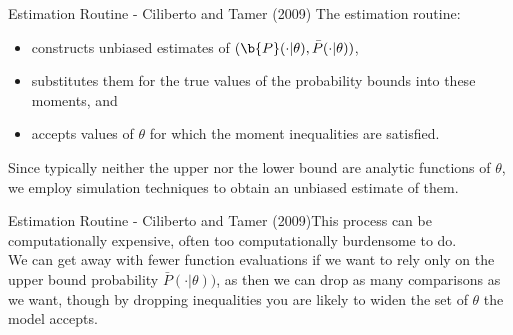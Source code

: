 \documentclass[aspectratio=169,11pt]{beamer}
\begin{document}
\begin{frame}{Estimation Routine - Ciliberto and Tamer (2009)}
The estimation routine:
\begin{itemize}
\item constructs unbiased estimates of $(\b{P}(\cdot|\theta),\bar{P}(\cdot|\theta))$, 
\item substitutes them for the true values of the probability bounds into these moments, and
\item accepts values of  $\theta$ for which the moment inequalities are satisfied.
\end{itemize}
\vspace{0.1in}
Since typically neither the upper nor the lower bound are
analytic functions of $\theta$, we employ simulation techniques to obtain an unbiased estimate of them.\\
\vspace{0.2in}
\end{frame}
\begin{frame}{Estimation Routine - Ciliberto and Tamer (2009)}This process can be computationally expensive, often too computationally burdensome
to do. \\
\vspace{0.2in}
We can get away with fewer function evaluations if
we want to rely only on the upper bound probability $\bar{P}( \cdot | \theta))$, as
then we can drop as many comparisons as we want, though by
dropping inequalities you are likely to widen the set of  $\theta$ the
model accepts.
\end{frame}
\end{document}
